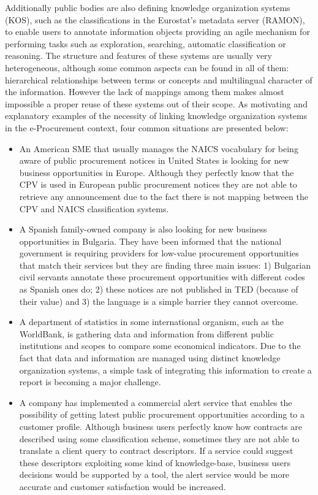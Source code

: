 Additionally public bodies are also defining knowledge organization systems (KOS), such as the classifications in the Eurostat's metadata server (RAMON), 
to enable users to annotate information objects providing an agile mechanism for performing tasks such as exploration, searching, 
automatic classification or reasoning. The structure and features of these systems are usually very heterogeneous, 
although some common aspects can be found in all of them: hierarchical relationships between terms or concepts and multilingual character of the information. 
However the lack of mappings among them makes almost impossible a proper reuse of these systems out of their scope. As motivating and 
explanatory examples of the necessity of linking knowledge organization systems in the e-Procurement context, 
four common situations are presented below:

\begin{itemize}
 \item An American SME that usually manages the NAICS vocabulary for being aware of public procurement 
notices in United States is looking for new business opportunities in Europe. Although they perfectly 
know that the CPV is used in European public procurement notices they are not able to retrieve 
any announcement due to the fact there is not mapping between the CPV and NAICS classification systems.
\item A Spanish family-owned company is also looking for new business opportunities in Bulgaria. They have been informed 
that the national government is requiring providers for low-value procurement opportunities that match their services but they 
are finding three main issues: 1) Bulgarian civil servants annotate these procurement opportunities with different codes as Spanish ones do; 2) 
these notices are not published in TED (because of their value) and 3) the language is a simple barrier they cannot overcome.
\item A department of statistics in some international organism, such as the WorldBank, is gathering data and information 
from different public institutions and scopes to compare some economical indicators. Due to the fact that data and information are managed 
using distinct knowledge organization systems, a simple task of integrating this information to create a report is becoming a major challenge.
\item A company has implemented a commercial alert service that enables the possibility of getting latest public 
procurement opportunities according to a customer profile. Although business users perfectly know how contracts are described using 
some classification scheme, sometimes they are not able to translate a client query to contract descriptors. If a 
service could suggest these descriptors exploiting some kind of knowledge-base, business users decisions would be supported by a tool, 
the alert service would be more accurate and customer satisfaction would be increased.
\end{itemize}

